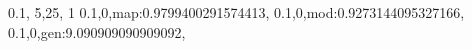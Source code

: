 0.1,
5,25,
1
0.1,0,map:0.9799400291574413,
0.1,0,mod:0.9273144095327166,
0.1,0,gen:9.090909090909092,
